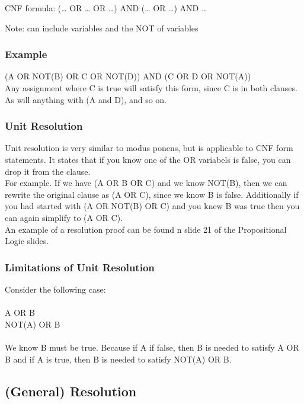 \documentclass[letterpaper]{article} %
\begin{document}
CNF formula: (… OR … OR …) AND (… OR …) AND …

Note: can include variables and the NOT of variables

\subsubsection{Example}

(A OR NOT(B) OR C OR NOT(D)) AND (C OR D OR NOT(A))\\

Any assignment where C is true will satisfy this form, since C is in both clauses. As will anything with (A and D), and so on.

\subsubsection{Unit Resolution}

Unit resolution is very similar to modus ponens, but is applicable to CNF form statements. It states that if you know one of the OR variabels is false, you can drop it from the clause.\\

For example. If we have (A OR B OR C) and we know NOT(B), then we can rewrite the original clause as (A OR C), since we know B is false. Additionally if you had started with (A OR NOT(B) OR C) and you knew B was true then you can again simplify to (A OR C).\\

An example of a resolution proof can be found n slide 21 of the Propositional Logic slides.

\subsubsection{Limitations of Unit Resolution}

Consider the following case:\\\\

A OR B\\
NOT(A) OR B\\\\

We know B must be true. Because if A if false, then B is needed to satisfy A OR B and if A is true, then B is needed to satisfy NOT(A) OR B.

\subsection{(General) Resolution}
\end{document}
